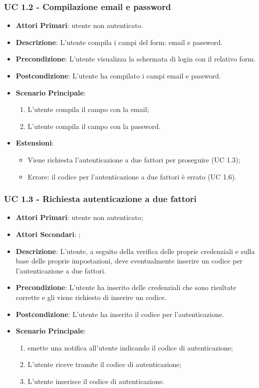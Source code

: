 		\subsubsection{UC 1.2 - Compilazione email e password}
		\begin{itemize}
			\item \textbf{Attori Primari}: utente non autenticato.
			\item \textbf{Descrizione}: L'utente compila i campi del form: email e password.
			\item \textbf{Precondizione}: L'utente visualizza la schermata di login con il relativo form.
			\item \textbf{Postcondizione}: L'utente ha compilato i campi email e password.
			\item \textbf{Scenario Principale}:
			\begin{enumerate}
				\item L'utente compila il campo con la email;
				\item L'utente compila il campo con la password.
			\end{enumerate}	
			\item \textbf{Estensioni}:
			\begin{itemize}
				\item Viene richiesta l'autenticazione a due fattori per proseguire (UC 1.3);
				\item Errore: il codice per l'autenticazione a due fattori è errato (UC 1.6).
			\end{itemize}
		\end{itemize}

		\subsubsection{UC 1.3 - Richiesta autenticazione a due fattori}
		\begin{itemize}
			\item \textbf{Attori Primari}: utente non autenticato;
			\item \textbf{Attori Secondari}: ;
			\item \textbf{Descrizione}: L'utente, a seguito della verifica delle proprie credenziali e sulla base delle proprie impostazioni, deve eventualmente inserire un codice per l'autenticazione a due fattori.
			\item \textbf{Precondizione}: L'utente ha inserito delle credenziali che sono risultate corrette e gli viene richiesto di inserire un codice.
			\item \textbf{Postcondizione}: L'utente ha inserito il codice per l'autenticazione.
			\item \textbf{Scenario Principale}:
			\begin{enumerate}
				\item {} emette una notifica all'utente indicando il codice di autenticazione;
				\item L'utente riceve tramite  il codice di autenticazione;
				\item L'utente inserisce il codice di autenticazione.
			\end{enumerate}	
		\end{itemize}

